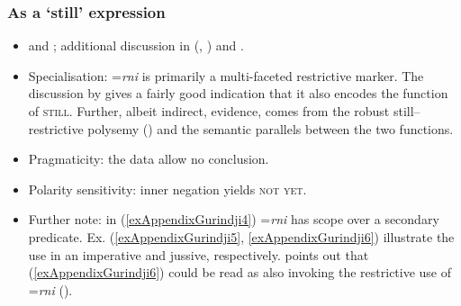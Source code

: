 \subsubsection{As a \lq{}still\rq{} expression}
\begin{itemize}
	\item \textcite{McConvell1983} and \textcite[594–595]{MeakinsMcConvell2021}; additional discussion in \citeauthor{vanBaar1991} (\citeyear{vanBaar1991}, \citeyear[112–113]{vanBaar1997}) and \textcite{SchultzeBerndt2002}.
	\item Specialisation: \mbox{=\textit{rni}} is primarily a multi-faceted restrictive marker. The discussion by \textcite{McConvell1983} gives a fairly good indication that it also encodes the function of \textsc{still}. Further, albeit indirect, evidence, comes from the robust still–restrictive polysemy () and the semantic parallels between the two functions.
	\item Pragmaticity: the data allow no conclusion.
	\item Polarity sensitivity: inner negation yields \textsc{not yet}.
	\item Further note: in (\ref{exAppendixGurindji4}) \mbox{=\textit{rni}} has scope over a secondary predicate. Ex. (\ref{exAppendixGurindji5}, \ref{exAppendixGurindji6}) illustrate the use in an imperative and jussive, respectively. \textcite[17]{McConvell1983} points out that (\ref{exAppendixGurindji6}) could be read as also invoking the restrictive use of \mbox{=\textit{rni}} ().
	\end{itemize}
